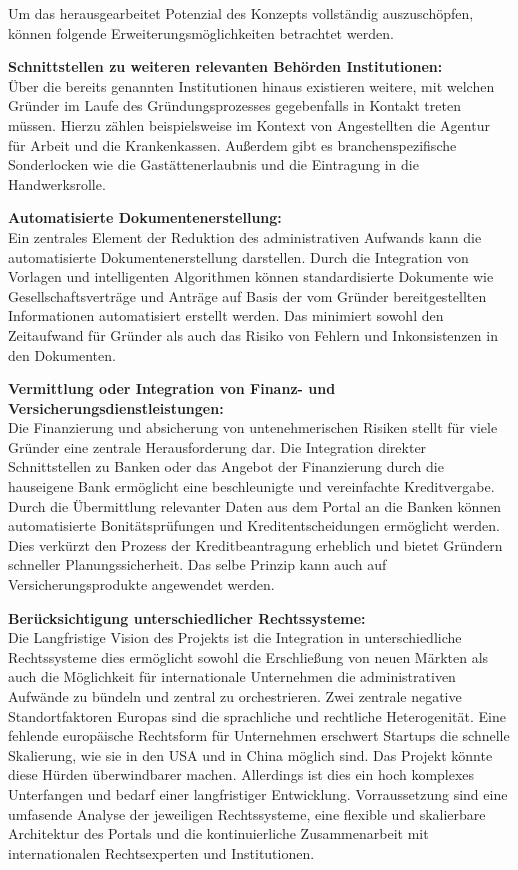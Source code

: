Um das herausgearbeitet Potenzial des Konzepts vollständig auszuschöpfen, können folgende Erweiterungsmöglichkeiten betrachtet werden.


\textbf{Schnittstellen zu weiteren relevanten Behörden Institutionen:} \\
Über die bereits genannten Institutionen hinaus existieren weitere, mit welchen Gründer im Laufe des Gründungsprozesses gegebenfalls in Kontakt treten müssen.
Hierzu zählen beispielsweise im Kontext von Angestellten die Agentur für Arbeit und die Krankenkassen.
Außerdem gibt es branchenspezifische Sonderlocken wie die Gastättenerlaubnis und die Eintragung in die Handwerksrolle.


\textbf{Automatisierte Dokumentenerstellung:} \\
Ein zentrales Element der Reduktion des administrativen Aufwands kann die automatisierte Dokumentenerstellung darstellen.
Durch die Integration von Vorlagen und intelligenten Algorithmen können standardisierte Dokumente wie Gesellschaftsverträge und Anträge auf Basis der vom Gründer bereitgestellten Informationen automatisiert erstellt werden.
Das minimiert sowohl den Zeitaufwand für Gründer als auch das Risiko von Fehlern und Inkonsistenzen in den Dokumenten.

\textbf{Vermittlung oder Integration von Finanz- und Versicherungsdienstleistungen:} \\
Die Finanzierung und absicherung von untenehmerischen Risiken stellt für viele Gründer eine zentrale Herausforderung dar. 
Die Integration direkter Schnittstellen zu Banken oder das Angebot der Finanzierung durch die hauseigene Bank ermöglicht eine beschleunigte und vereinfachte Kreditvergabe.
Durch die Übermittlung relevanter Daten aus dem Portal an die Banken können automatisierte Bonitätsprüfungen und Kreditentscheidungen ermöglicht werden. Dies verkürzt den Prozess der Kreditbeantragung erheblich und bietet Gründern schneller Planungssicherheit.
Das selbe Prinzip kann auch auf Versicherungsprodukte angewendet werden.

\textbf{Berücksichtigung unterschiedlicher Rechtssysteme:} \\
Die Langfristige Vision des Projekts ist die Integration in unterschiedliche Rechtssysteme dies ermöglicht sowohl die Erschließung von neuen Märkten als auch die Möglichkeit für internationale Unternehmen die administrativen Aufwände zu bündeln und zentral zu orchestrieren.
Zwei zentrale negative Standortfaktoren Europas sind die sprachliche und rechtliche Heterogenität. Eine fehlende europäische Rechtsform für Unternehmen erschwert Startups die schnelle Skalierung, wie sie in den USA und in China möglich sind.
Das Projekt könnte diese Hürden überwindbarer machen. Allerdings ist dies ein hoch komplexes Unterfangen und bedarf einer langfristiger Entwicklung. Vorraussetzung sind eine umfasende Analyse der jeweiligen Rechtssysteme, eine flexible und skalierbare Architektur des Portals und die kontinuierliche Zusammenarbeit mit internationalen Rechtsexperten und Institutionen.


